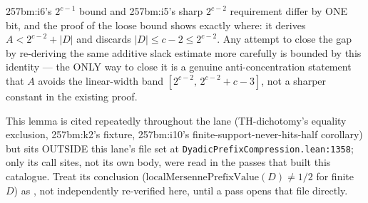 \begin{obs}
257bm:i6's $2^{c-1}$ bound and 257bm:i5's sharp $2^{c-2}$ requirement differ by ONE bit, and the
proof of the loose bound shows exactly where: it derives $A<2^{c-2}+|D|$ and discards
$|D|\le c-2\le2^{c-2}$. Any attempt to close the gap by re-deriving the same additive slack
estimate more carefully is bounded by this identity — the ONLY way to close it is a genuine
anti-concentration statement that $A$ avoids the linear-width band
$[2^{c-2},\,2^{c-2}+c-3]$, not a sharper constant in the existing proof.
\par\noindent{}   
\end{obs}

\begin{obs}
This lemma is cited repeatedly throughout the lane (TH-dichotomy's equality exclusion,
257bm:k2's fixture, 257bm:i10's finite-support-never-hits-half corollary) but sits OUTSIDE this
lane's file set at \texttt{DyadicPrefixCompression.lean:1358}; only its call sites, not its own
body, were read in the passes that built this catalogue. Treat its conclusion
($\mathrm{localMersennePrefixValue}(D)\ne1/2$ for finite $D$) as , not
independently re-verified here, until a pass opens that file directly.
\par\noindent{}   
\end{obs}

